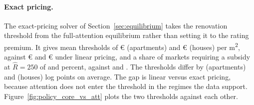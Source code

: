 \paragraph{Exact pricing.}
The exact-pricing solver of Section~\ref{sec:equilibrium} takes the renovation threshold from the full-attention equilibrium rather than setting it to the rating premium. It gives mean thresholds of \euro{}\attRbarCoreEurTwoFiftyApt{} (apartments) and \euro{}\attRbarCoreEurTwoFiftyHouse{} (houses) per m\textsuperscript{2}, against \euro{}\attScBaseRbarApt{} and \euro{}\attScBaseRbarHouse{} under linear pricing, and a share of markets requiring a subsidy at $\hat R=250$ of \attSharePosCoreTwoFiftyApt{} and \attSharePosCoreTwoFiftyHouse{} percent, against \attScBaseShareTwoFiftyApt{} and \attScBaseShareTwoFiftyHouse{}. The thresholds differ by \attRbarGapApt{} (apartments) and \attRbarGapHouse{} (houses) log points on average. The gap is linear versus exact pricing, because attention does not enter the threshold in the regimes the data support. Figure~\ref{fig:policy_core_vs_att} plots the two thresholds against each other.
